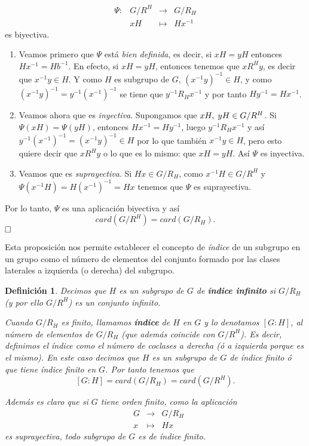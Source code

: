 \documentclass[12pt]{article}
\newtheorem{definition}[theorem]{Definición}
\begin{document}
$$
\begin{array}{rccl}
\Psi \colon &G/R^{H} & \longrightarrow & G/R_{H}\\
&xH & \longmapsto &Hx^{-1}
\end{array}
$$
es biyectiva. \begin{enumerate} 
\item Veamos primero que $\Psi$ está \textit{bien definida}, es decir, si $xH = yH$ entonces $Hx^{-1} = Hb^{-1}$. En efecto, si $xH = yH$, entonces tenemos que $x R^{H}y$, es decir que $x^{-1}y \in H$. Y como $H$ es subgrupo de $G$, $(x^{-1}y)^{-1} \in H$, y como $(x^{-1}y)^{-1} = y^{-1}(x^{-1})^{-1}$ se tiene que $y^{-1}R_{H}x^{-1}$ y por tanto $Hy^{-1} = Hx^{-1}$.
\item Veamos ahora que es \textit{inyectiva}. Supongamos que $xH, \hspace{0.1cm} yH \in G/R^{H}$. Si $\Psi (xH) = \Psi (yH)$, entonces $Hx^{-1} = Hy^{-1}$, luego $y^{-1}R_{H}x^{-1}$ y así $y^{-1}(x^{-1})^{-1} = (x^{-1}y)^{-1} \in H$ por lo que también $x^{-1}y \in H$, pero esto quiere decir que $x R^{H}y$ o lo que es lo mismo: que $xH = yH$. Así $\Psi$ es inyectiva.
\item Veamos que es \textit{suprayectiva}. Si $Hx \in G/R_{H}$, como $x^{-1}H \in G/R^{H}$ y $\Psi (x^{-1}H) = H(x^{-1})^{-1} = Hx$ tenemos que $\Psi$ es suprayectiva.
\end{enumerate}
Por lo tanto, $\Psi$ es una aplicación biyectiva y así $$card(G/R^{H}) = card(G/R_{H}).$$
$\hfill \square$

Esta proposición nos permite establecer el concepto de \textit{índice} de un subgrupo en un grupo como el número de elementos del conjunto formado por las clases laterales a izquierda (o derecha) del subgrupo.

\begin{definition} \label{eq:indice} Decimos que $H$ es un subgrupo de $G$ de \textbf{índice infinito} si $G/R_{H}$ (y por ello $G/R^{H}$) es un conjunto infinito.


Cuando $G/R_{H}$ es finito, llamamos \textbf{índice} de $H$ en $G$ y lo denotamos $\left[ G:H \right]$, al número de elementos de $G/R_{H}$ (que además coincide con $G/R^{H}$). Es decir, definimos el índice como el número de coclases a derecha (ó a izquierda porque es el mismo). En este caso decimos que $H$ es un subgrupo de $G$ de índice finito ó que tiene índice finito en $G$. Por tanto tenemos que $$\left[ G:H \right] = card(G/R_{H}) = card(G/R^{H}).$$

Además es claro que si $G$ tiene orden finito, como la aplicación $$
\begin{array}{rccl}
&G & \longrightarrow & G/R_{H}\\
&x & \longmapsto &Hx
\end{array}
$$ es suprayectiva, todo subgrupo de $G$ es de índice finito.
\end{definition}
\end{document}
